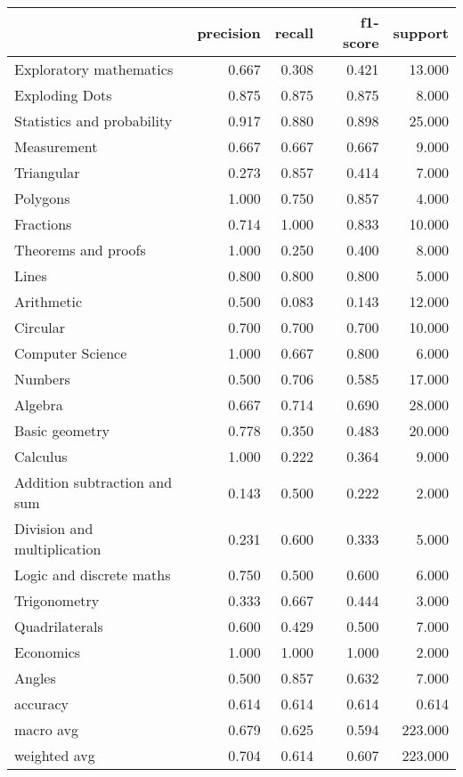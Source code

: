 \begin{tabular}{lrrrr}
\toprule
{} &  precision &  recall &  f1-score &  support \\
\midrule
Exploratory mathematics      &      0.667 &   0.308 &     0.421 &   13.000 \\
Exploding Dots               &      0.875 &   0.875 &     0.875 &    8.000 \\
Statistics and probability   &      0.917 &   0.880 &     0.898 &   25.000 \\
Measurement                  &      0.667 &   0.667 &     0.667 &    9.000 \\
Triangular                   &      0.273 &   0.857 &     0.414 &    7.000 \\
Polygons                     &      1.000 &   0.750 &     0.857 &    4.000 \\
Fractions                    &      0.714 &   1.000 &     0.833 &   10.000 \\
Theorems and proofs          &      1.000 &   0.250 &     0.400 &    8.000 \\
Lines                        &      0.800 &   0.800 &     0.800 &    5.000 \\
Arithmetic                   &      0.500 &   0.083 &     0.143 &   12.000 \\
Circular                     &      0.700 &   0.700 &     0.700 &   10.000 \\
Computer Science             &      1.000 &   0.667 &     0.800 &    6.000 \\
Numbers                      &      0.500 &   0.706 &     0.585 &   17.000 \\
Algebra                      &      0.667 &   0.714 &     0.690 &   28.000 \\
Basic geometry               &      0.778 &   0.350 &     0.483 &   20.000 \\
Calculus                     &      1.000 &   0.222 &     0.364 &    9.000 \\
Addition subtraction and sum &      0.143 &   0.500 &     0.222 &    2.000 \\
Division and multiplication  &      0.231 &   0.600 &     0.333 &    5.000 \\
Logic and discrete maths     &      0.750 &   0.500 &     0.600 &    6.000 \\
Trigonometry                 &      0.333 &   0.667 &     0.444 &    3.000 \\
Quadrilaterals               &      0.600 &   0.429 &     0.500 &    7.000 \\
Economics                    &      1.000 &   1.000 &     1.000 &    2.000 \\
Angles                       &      0.500 &   0.857 &     0.632 &    7.000 \\
accuracy                     &      0.614 &   0.614 &     0.614 &    0.614 \\
macro avg                    &      0.679 &   0.625 &     0.594 &  223.000 \\
weighted avg                 &      0.704 &   0.614 &     0.607 &  223.000 \\
\bottomrule
\end{tabular}
